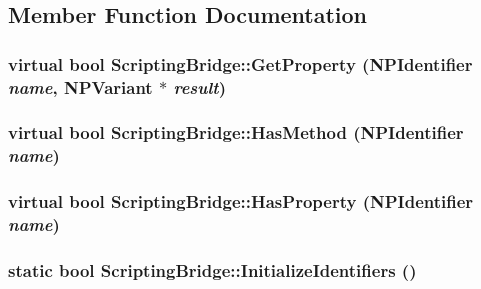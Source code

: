 \subsection{Member Function Documentation}
\hypertarget{class_scripting_bridge_ac971765b22d611a0e0661a523650885d}{
\subsubsection[{GetProperty}]{\setlength{\rightskip}{0pt plus 5cm}virtual bool ScriptingBridge::GetProperty (NPIdentifier {\em name}, \/  NPVariant $\ast$ {\em result})}}
\label{class_scripting_bridge_ac971765b22d611a0e0661a523650885d}
\hypertarget{class_scripting_bridge_a7eafa4200bb68bf6632c6b635aa4953f}{
\subsubsection[{HasMethod}]{\setlength{\rightskip}{0pt plus 5cm}virtual bool ScriptingBridge::HasMethod (NPIdentifier {\em name})}}
\label{class_scripting_bridge_a7eafa4200bb68bf6632c6b635aa4953f}
\hypertarget{class_scripting_bridge_a425cfcd308f30736bf936f2e0aca1d6c}{
\subsubsection[{HasProperty}]{\setlength{\rightskip}{0pt plus 5cm}virtual bool ScriptingBridge::HasProperty (NPIdentifier {\em name})}}
\label{class_scripting_bridge_a425cfcd308f30736bf936f2e0aca1d6c}
\hypertarget{class_scripting_bridge_a744b9ecf0b3f4a39aa51c85b1ee5d5e9}{
\subsubsection[{InitializeIdentifiers}]{\setlength{\rightskip}{0pt plus 5cm}static bool ScriptingBridge::InitializeIdentifiers ()}}

